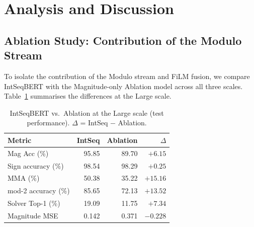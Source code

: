 
\section{Analysis and Discussion}
\label{sec:analysis}

\subsection{Ablation Study: Contribution of the Modulo Stream}
\label{sec:ablation}

To isolate the contribution of the Modulo stream and FiLM fusion, we compare IntSeqBERT with
the Magnitude-only Ablation model across all three scales. Table~\ref{tab:ablation} summarises
the differences at the Large scale.

\begin{table}[t]
\caption{IntSeqBERT vs.\ Ablation at the Large scale (test performance).
         $\Delta$ = IntSeq $-$ Ablation.}
\label{tab:ablation}
\centering
\begin{tabular}{lrrr}
\hline
Metric              & IntSeq & Ablation & $\Delta$ \\
\hline
Mag Acc (\%)        &  95.85 &    89.70 &   $+6.15$ \\
Sign accuracy (\%)  &  98.54 &    98.29 &   $+0.25$ \\
MMA (\%)            &  50.38 &    35.22 &  $+15.16$ \\
mod-2 accuracy (\%) &  85.65 &    72.13 &  $+13.52$ \\
Solver Top-1 (\%)   &  19.09 &    11.75 &   $+7.34$ \\
Magnitude MSE       &  0.142 &     0.371&   $-0.228$\\
\hline
\end{tabular}
\end{table}

